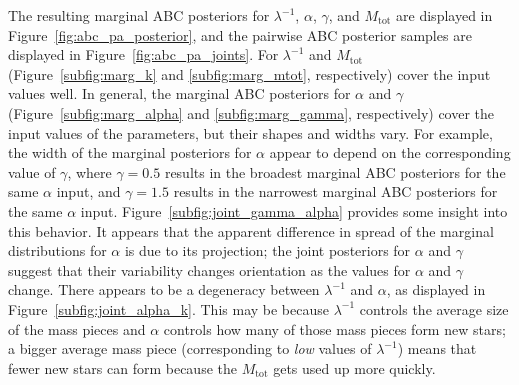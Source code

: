 \documentclass[ejs]{imsart}
\numberwithin{equation}{section}
\theoremstyle{plain}
\newcommand{\nobs}{n_{\text{obs}}}
\newcommand{\Mtot}{M_{\text{tot}}}
\begin{document}
%


The resulting marginal ABC posteriors for $\lambda^{-1}$, $\alpha$, $\gamma$, and $\Mtot$ are displayed in Figure~\ref{fig:abc_pa_posterior}, and the pairwise ABC posterior samples are displayed in Figure~\ref{fig:abc_pa_joints}.  
%
For $\lambda^{-1}$ and $\Mtot$ (Figure~\ref{subfig:marg_k} and \ref{subfig:marg_mtot}, respectively) cover the input values well.   
%
In general, the marginal ABC posteriors for $\alpha$ and $\gamma$ (Figure~\ref{subfig:marg_alpha} and \ref{subfig:marg_gamma}, respectively) cover the input values of the parameters, but their shapes and widths vary.  
%
For example, the width of the marginal posteriors for $\alpha$ appear to depend on the corresponding value of $\gamma$, where $\gamma = 0.5$ results in the broadest marginal ABC posteriors for the same $\alpha$ input, and $\gamma = 1.5$ results in the narrowest marginal ABC posteriors for the same $\alpha$ input. 
Figure~\ref{subfig:joint_gamma_alpha} provides some insight into this behavior.  It appears that the apparent difference in spread of the marginal distributions for $\alpha$ is due to its projection; the joint posteriors for $\alpha$ and $\gamma$ suggest that their variability changes orientation as the values for $\alpha$ and $\gamma$ change.
%
There appears to be a degeneracy between  $\lambda^{-1}$ and $\alpha$, as displayed in Figure~\ref{subfig:joint_alpha_k}.  This may be because $\lambda^{-1}$ controls the average size of the mass pieces and $\alpha$ controls how many of those mass pieces form new stars; a bigger average mass piece (corresponding to \emph{low} values of $\lambda^{-1}$) means that fewer new stars can form because the $\Mtot$ gets used up more quickly.
%
\end{document}
